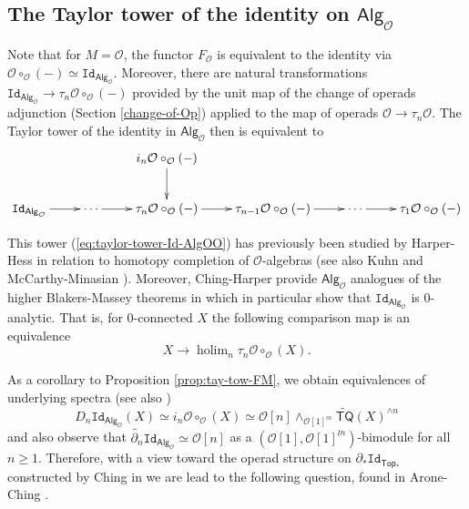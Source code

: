 \documentclass[11pt]{amsart}
\theoremstyle{definition}
\theoremstyle{remark}
\newcommand{\TQ}{\mathsf{TQ}}
\newcommand{\holim}{\operatorname{holim}}
\newcommand{\Alg}[1]{ {\mathsf{Alg}_{\mathcal{#1}}} }
\newcommand{\Id}{\mathtt{Id}}
\newcommand{\Cal}[1]{\mathcal{#1}}
\begin{document}
\subsection{The Taylor tower of the identity on $\Alg{O}$}
Note that for $M=\Cal{O}$, the functor $F_{\Cal{O}}$ is equivalent to the identity via $\Cal{O} \circ_{\Cal{O}} (-)\simeq \Id_{\Alg{O}}$. Moreover, there are natural transformations $\Id_{\Alg{O}} \to \tau_n \Cal{O}\circ_{\Cal{O}}(-)$ provided by the unit map of the change of operads adjunction (Section \ref{change-of-Op}) applied to the map of operads $\Cal{O}\to \tau_n \Cal{O}$. The Taylor tower of the identity in $\Alg{O}$ then is equivalent to 
\begin{equation}\label{eq:taylor-tower-Id-AlgOO}
    \xymatrix{
    && i_n \Cal{O} \circ_{\Cal{O}}(-) \ar[d] & & 
    \\
    \Id_{\Alg{O}}\ar[r] & 
    \cdots \ar[r] & 
    \tau_n\Cal{O}\circ_{\Cal{O}} (-) \ar[r] & 
    \tau_{n-1}\Cal{O}\circ_{\Cal{O}}(-) \ar[r] & \cdots \ar[r] & \tau_1\Cal{O}\circ_{\Cal{O}}(-)
    }
\end{equation}

This tower (\ref{eq:taylor-tower-Id-AlgOO}) has previously been studied by Harper-Hess \cite{Har-Hess} in relation to homotopy completion of $\Cal{O}$-algebras (see also Kuhn \cite{Kuh} and McCarthy-Minasian \cite{MM}). Moreover, Ching-Harper provide $\Alg{O}$ analogues of the higher Blakers-Massey theorems in \cite{Ching-Harper-BM}  which in particular show that $\Id_{\Alg{O}}$ is $0$-analytic. That is, for $0$-connected $X$ the following comparison map is an equivalence \[X \to \holim_n \tau_n \Cal{O} \circ_{\Cal{O}}(X).\] 

As a corollary to Proposition \ref{prop:tay-tow-FM}, we obtain equivalences of underlying spectra (see also \cite{Har-Hess}) \[
    D_n \Id_{\Alg{O}}(X)\simeq i_n \Cal{O} \circ_{\Cal{O}}(X)\simeq \Cal{O}[n] \wedge_{\Cal{O}[1]^{\wr n}} \widetilde{\TQ}(X)^{\wedge n}\] 
and also observe that $\widetilde{\partial_n} \Id_{\Alg{O}}\simeq \Cal{O}[n]$ as a $(\Cal{O}[1], \Cal{O}[1]^{\wr n})$-bimodule for all $n\geq 1$. Therefore, with a view toward the operad structure on $\partial_*\Id_{\mathsf{Top}_*}$ constructed by Ching in \cite{Ching-thesis} we are lead to the following question, found in Arone-Ching \cite{AC-1}.

\end{document}
